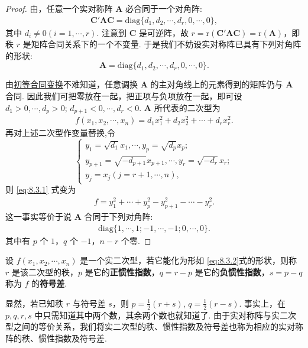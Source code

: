 \documentclass[../../main.tex]{subfiles}
\begin{document}
\begin{proof}
由，任意一个实对称阵 $\boldsymbol{A}$ 必合同于一个对角阵:
\begin{align*}
\boldsymbol{C}'\boldsymbol{A}\boldsymbol{C}=\mathrm{diag}\{d_1,d_2,\cdots,d_r,0,\cdots,0\},
\end{align*}
其中 $d_i\neq 0 (i = 1,\cdots,r)$. 注意到 $\boldsymbol{C}$ 是可逆阵，故 $r = \mathrm{r}(\boldsymbol{C}'\boldsymbol{A}\boldsymbol{C})=\mathrm{r}(\boldsymbol{A})$，即秩 $r$ 是矩阵合同关系下的一个不变量. 于是我们不妨设实对称阵已具有下列对角阵的形状:
\[
\boldsymbol{A}=\mathrm{diag}\{d_1,d_2,\cdots,d_r,0,\cdots,0\}.
\]

由\hyperref[lemma:初等合同变换]{初等合同变换}不难知道，任意调换 $\boldsymbol{A}$ 的主对角线上的元素得到的矩阵仍与 $\boldsymbol{A}$ 合同. 因此我们可把零放在一起，把正项与负项放在一起，即可设 $d_1>0,\cdots,d_p>0$; $d_{p + 1}<0,\cdots,d_r<0$. $\boldsymbol{A}$ 所代表的二次型为
\begin{align}
f(x_1,x_2,\cdots,x_n)=d_1x_1^2 + d_2x_2^2 + \cdots + d_rx_r^2.\label{eq:8.3.1}
\end{align}
再对上述二次型作变量替换,令
\[
\begin{cases}
y_1 = \sqrt{d_1}x_1,\cdots,y_p = \sqrt{d_p}x_p;\\
y_{p + 1} = \sqrt{-d_{p + 1}}x_{p + 1},\cdots,y_r = \sqrt{-d_r}x_r;\\
y_j = x_j (j = r + 1,\cdots,n),
\end{cases}
\]
则 \eqref{eq:8.3.1} 式变为
\begin{align*}
f = y_1^2 + \cdots + y_p^2 - y_{p + 1}^2 - \cdots - y_r^2.
\end{align*}
这一事实等价于说 $\boldsymbol{A}$ 合同于下列对角阵:
\begin{align*}
\mathrm{diag}\{1,\cdots,1;-1,\cdots,-1;0,\cdots,0\}.
\end{align*}
其中有 $p$ 个 $1$，$q$ 个 $-1$，$n - r$ 个零. 

\end{proof}

\begin{definition}
设 $f(x_1,x_2,\cdots,x_n)$ 是一个实二次型，若它能化为形如 \eqref{eq:8.3.2}式的形状，则称 $r$ 是该二次型的秩，$p$ 是它的\textbf{正惯性指数}，$q = r - p$ 是它的\textbf{负惯性指数}，$s = p - q$ 称为 $f$ 的\textbf{符号差}.
\end{definition}
\begin{remark}
显然，若已知秩 $r$ 与符号差 $s$，则 $p = \frac{1}{2}(r + s)$, $q = \frac{1}{2}(r - s)$. 事实上，在 $p,q,r,s$ 中只需知道其中两个数，其余两个数也就知道了. 由于实对称阵与实二次型之间的等价关系，我们将实二次型的秩、惯性指数及符号差也称为相应的实对称阵的秩、惯性指数及符号差.
\end{remark}
\end{document}
